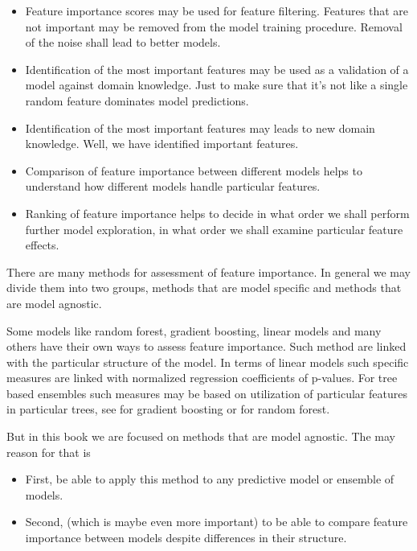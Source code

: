 \documentclass[12pt,]{krantz}
\providecommand{\tightlist}{%
  \setlength{\itemsep}{0pt}\setlength{\parskip}{0pt}}
\theoremstyle{definition}
\theoremstyle{definition}
\theoremstyle{definition}
\theoremstyle{remark}
\begin{document}
\begin{itemize}
\tightlist
\item
  Feature importance scores may be used for feature filtering. Features
  that are not important may be removed from the model training
  procedure. Removal of the noise shall lead to better models.
\item
  Identification of the most important features may be used as a
  validation of a model against domain knowledge. Just to make sure that
  it's not like a single random feature dominates model predictions.
\item
  Identification of the most important features may leads to new domain
  knowledge. Well, we have identified important features.
\item
  Comparison of feature importance between different models helps to
  understand how different models handle particular features.
\item
  Ranking of feature importance helps to decide in what order we shall
  perform further model exploration, in what order we shall examine
  particular feature effects.
\end{itemize}

There are many methods for assessment of feature importance. In general
we may divide them into two groups, methods that are model specific and
methods that are model agnostic.

Some models like random forest, gradient boosting, linear models and
many others have their own ways to assess feature importance. Such
method are linked with the particular structure of the model. In terms
of linear models such specific measures are linked with normalized
regression coefficients of p-values. For tree based ensembles such
measures may be based on utilization of particular features in
particular trees, see \citep{xgboostExplainer} for gradient boosting or
\citep{randomForestExplainer} for random forest.

But in this book we are focused on methods that are model agnostic. The
may reason for that is

\begin{itemize}
\tightlist
\item
  First, be able to apply this method to any predictive model or
  ensemble of models.
\item
  Second, (which is maybe even more important) to be able to compare
  feature importance between models despite differences in their
  structure.
\end{itemize}
\end{document}

